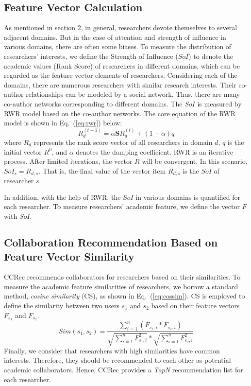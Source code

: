 \documentclass[10pt,letterpaper]{article}
\begin{document}
\subsection*{Feature Vector Calculation}
As mentioned in section 2, in general, researchers devote themselves to several adjacent domains. But in the case of attention and strength of influence in various domains, there are often some biases. To measure the distribution of researchers' interests, we define the Strength of Influence ($SoI$) to denote the academic values (Rank Score) of researchers in different domains, which can be regarded as the feature vector elements of researchers. Considering each of the domains, there are numerous researchers with similar research interests. Their co-author relationships can be modeled by a social network. Thus, there are many co-author networks corresponding to different domains. The $SoI$ is measured by RWR model based on the co-author networks. The core equation of the RWR model is shown in Eq.~(\ref{eq:rwr}) below:
\begin{equation}\label{eq:rwr}
R_{d}^{(t+1)}=\alpha \mathbf{S}R_{d}^{(t)}+(1-\alpha)q
\end{equation}
where $R_{d}$ represents the rank score vector of all researchers in domain $d$, $q$ is the initial vector $R^0$, and $\alpha$ denotes the damping coefficient. RWR is an iterative process. After limited iterations, the vector $R$ will be convergent. In this scenario, $SoI_{s}=R_{d,s}$. That is, the final value of the vector item $R_{d,s}$ is the $SoI$ of researcher $s$.

In addition, with the help of RWR, the $SoI$ in various domains is quantified for each researcher. To measure researchers' academic feature, we define the vector $F$ with $SoI$.


\subsection*{Collaboration Recommendation Based on Feature Vector Similarity}
CCRec recommends collaborators for researchers based on their similarities. To measure the academic feature similarities of researchers, we borrow a standard method, \emph{cosine similarity} (CS), as shown in Eq.~(\ref{eq:cossim}). CS is employed to define the similarity between two users $s_{1}$ and $s_{2}$ based on their feature vectors $F_{s_{1}}$ and $F_{s_{2}}$.
\begin{equation}\label{eq:cossim}
Sim(s_{1},s_{2})=\frac{\sum_{i=1}^{n}(F_{s_{1},i}*F_{s_{2},i})}{\sqrt{\sum_{i=1}^{n}F_{s_{1},i}^2}*\sqrt{\sum_{i=1}^{n}F_{s_{2},i}^2}}
\end{equation}
Finally, we consider that researchers with high similarities have common interests. Therefore, they should be recommended to each other as potential academic collaborators. Hence, CCRec provides a \emph{TopN} recommendation list for each researcher.
\end{document}
